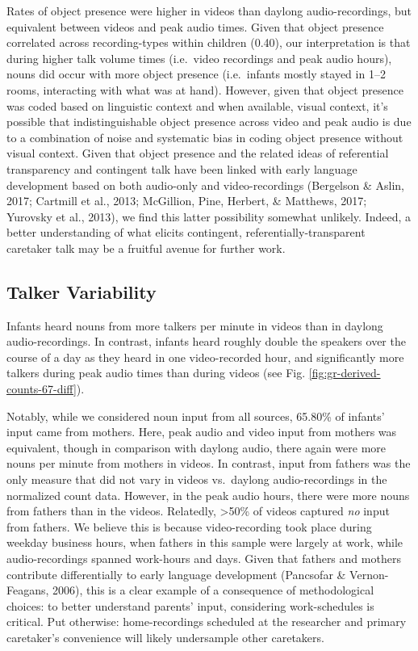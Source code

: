\documentclass[man]{apa6}
\theoremstyle{definition}
\theoremstyle{definition}
\theoremstyle{definition}
\theoremstyle{remark}
\begin{document}
Rates of object presence were higher in videos than daylong
audio-recordings, but equivalent between videos and peak audio times.
Given that object presence correlated across recording-types within
children (0.40), our interpretation is that during higher talk volume
times (i.e.~video recordings and peak audio hours), nouns did occur with
more object presence (i.e.~infants mostly stayed in 1--2 rooms,
interacting with what was at hand). However, given that object presence
was coded based on linguistic context and when available, visual
context, it's possible that indistinguishable object presence across
video and peak audio is due to a combination of noise and systematic
bias in coding object presence without visual context. Given that object
presence and the related ideas of referential transparency and
contingent talk have been linked with early language development based
on both audio-only and video-recordings (Bergelson \& Aslin, 2017;
Cartmill et al., 2013; McGillion, Pine, Herbert, \& Matthews, 2017;
Yurovsky et al., 2013), we find this latter possibility somewhat
unlikely. Indeed, a better understanding of what elicits contingent,
referentially-transparent caretaker talk may be a fruitful avenue for
further work.

\subsection{Talker Variability}\label{talker-variability}

Infants heard nouns from more talkers per minute in videos than in
daylong audio-recordings. In contrast, infants heard roughly double the
speakers over the course of a day as they heard in one video-recorded
hour, and significantly more talkers during peak audio times than during
videos (see Fig. \ref{fig:gr-derived-counts-67-diff}).

Notably, while we considered noun input from all sources, 65.80\% of
infants' input came from mothers. Here, peak audio and video input from
mothers was equivalent, though in comparison with daylong audio, there
again were more nouns per minute from mothers in videos. In contrast,
input from fathers was the only measure that did not vary in videos
vs.~daylong audio-recordings in the normalized count data. However, in
the peak audio hours, there were more nouns from fathers than in the
videos. Relatedly, \textgreater{}50\% of videos captured \emph{no} input
from fathers. We believe this is because video-recording took place
during weekday business hours, when fathers in this sample were largely
at work, while audio-recordings spanned work-hours and days. Given that
fathers and mothers contribute differentially to early language
development (Pancsofar \& Vernon-Feagans, 2006), this is a clear example
of a consequence of methodological choices: to better understand
parents' input, considering work-schedules is critical. Put otherwise:
home-recordings scheduled at the researcher and primary caretaker's
convenience will likely undersample other caretakers.
\end{document}
